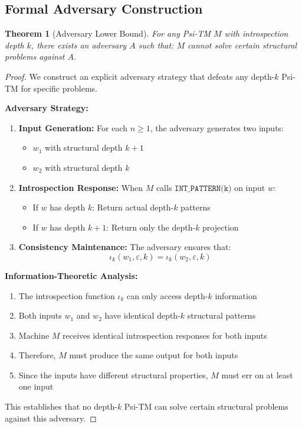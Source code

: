 \documentclass[11pt]{article}
\newtheorem{theorem}{Theorem}
\begin{document}
\subsection{Formal Adversary Construction}

\begin{theorem}[Adversary Lower Bound]
For any Psi-TM $M$ with introspection depth $k$, there exists an adversary $A$ such that:
$M$ cannot solve certain structural problems against $A$.
\end{theorem}

\begin{proof}
We construct an explicit adversary strategy that defeats any depth-$k$ Psi-TM for specific problems.

\textbf{Adversary Strategy:}
\begin{enumerate}
\item \textbf{Input Generation:} For each $n \geq 1$, the adversary generates two inputs:
  \begin{itemize}
  \item $w_1$ with structural depth $k+1$
  \item $w_2$ with structural depth $k$
  \end{itemize}

\item \textbf{Introspection Response:} When $M$ calls $\texttt{INT\_PATTERN(k)}$ on input $w$:
  \begin{itemize}
  \item If $w$ has depth $k$: Return actual depth-$k$ patterns
  \item If $w$ has depth $k+1$: Return only the depth-$k$ projection
  \end{itemize}

\item \textbf{Consistency Maintenance:} The adversary ensures that:
  $$\iota_k(w_1, \varepsilon, k) = \iota_k(w_2, \varepsilon, k)$$
\end{enumerate}

\textbf{Information-Theoretic Analysis:}
\begin{enumerate}
\item The introspection function $\iota_k$ can only access depth-$k$ information
\item Both inputs $w_1$ and $w_2$ have identical depth-$k$ structural patterns
\item Machine $M$ receives identical introspection responses for both inputs
\item Therefore, $M$ must produce the same output for both inputs
\item Since the inputs have different structural properties, $M$ must err on at least one input
\end{enumerate}

This establishes that no depth-$k$ Psi-TM can solve certain structural problems against this adversary.
\end{proof}
\end{document}
